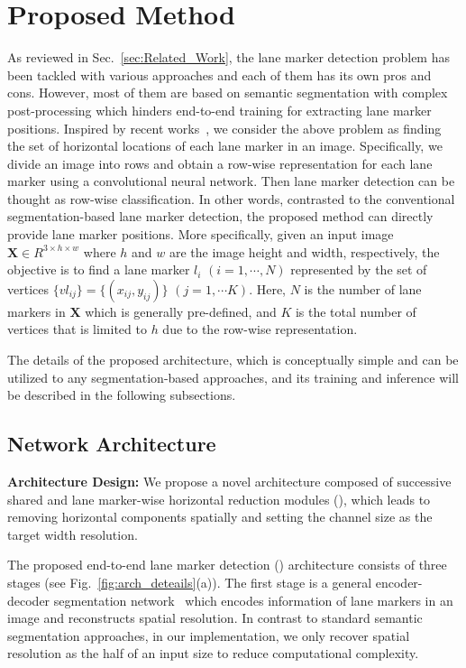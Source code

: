 \documentclass[10pt,twocolumn,letterpaper]{article}
\begin{document}
\section{Proposed Method}

As reviewed in Sec.~\ref{sec:Related_Work}, the lane marker detection problem has been tackled with various approaches and each of them has its own pros and cons. However, most of them are based on semantic segmentation with complex post-processing which hinders end-to-end training for extracting lane marker positions.
Inspired by recent works~\cite{Drivable, StixelNet}, we consider the above problem as finding the set of horizontal locations of each lane marker in an image.
Specifically, we divide an image into rows and obtain a row-wise representation for each lane marker using a convolutional neural network. Then lane marker detection can be thought as row-wise classification. In other words, contrasted to the conventional segmentation-based lane marker detection, the proposed method can directly provide lane marker positions.
More specifically, given an input image $\textbf{X} \in R^{3 \times h \times w}$ where $h$ and $w$ are the image height and width, respectively, the objective is to find a lane marker $l_i$ $(i=1, \cdots, N)$ represented by the set of vertices $\{vl_{ij}\} = \{(x_{ij}, y_{ij})\}$ $(j=1, \cdots K)$.
Here, $N$ is the number of lane markers in $\textbf{X}$ which is generally pre-defined, and $K$ is the total number of vertices that is limited to $h$ due to the row-wise representation.



The details of the proposed architecture, which is conceptually simple and can be utilized to any segmentation-based approaches, and its training and inference will be described in the following subsections.

\subsection{Network Architecture}\label{sec:net_arc}

\textbf{Architecture Design:} We propose a novel architecture composed of successive shared and lane marker-wise horizontal reduction modules (\reductionnames), which leads to removing horizontal components spatially and setting the channel size as the target width resolution.


The proposed end-to-end lane marker detection (\textbf{\algorithmname}) architecture consists of three stages (see Fig.~\ref{fig:arch_deteails}(a)). The first stage is a general encoder-decoder segmentation network~\cite{UNet} which encodes information of lane markers in an image and reconstructs spatial resolution. In contrast to standard semantic segmentation approaches, in our implementation, we only recover spatial resolution as the half of an input size to reduce computational complexity. 
\end{document}

